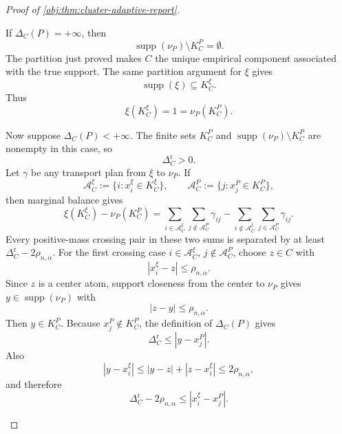 \begin{proof}[Proof of \cref{obj:thm:cluster-adaptive-report}]
\begin{enumerate}
If \(\Delta_C(P)=+\infty\), then
\[
\operatorname{supp}(\nu_P)\setminus K_C^P=\emptyset .
\]
The partition just proved makes \(C\) the unique empirical component associated
with the true support.  The same partition argument for \(\xi\) gives
\[
\operatorname{supp}(\xi)\subseteq K_C^\xi.
\]
Thus
\[
\xi(K_C^\xi)=1=\nu_P(K_C^P).
\]

Now suppose \(\Delta_C(P)<+\infty\).  The finite sets \(K_C^P\) and
\(\operatorname{supp}(\nu_P)\setminus K_C^P\) are nonempty in this case, so
\[
\Delta_C^{\mathrm r}>0.
\]
Let \(\gamma\) be any transport plan from \(\xi\) to \(\nu_P\).  If
\[
\mathscr A_C^\xi:=\{i:x_i^\xi\in K_C^\xi\},
\qquad
\mathscr A_C^P:=\{j:x_j^P\in K_C^P\},
\]
then marginal balance gives
\[
\xi(K_C^\xi)-\nu_P(K_C^P)
=
\sum_{i\in\mathscr A_C^\xi}\sum_{j\notin\mathscr A_C^P}\gamma_{ij}
-
\sum_{i\notin\mathscr A_C^\xi}\sum_{j\in\mathscr A_C^P}\gamma_{ij}.
\]
Every positive-mass crossing pair in these two sums is separated by at least
\(\Delta_C^{\mathrm r}-2\rho_{n,\alpha}\).  For the first crossing case
\(i\in\mathscr A_C^\xi\), \(j\notin\mathscr A_C^P\), choose
\(z\in C\) with
\[
|x_i^\xi-z|\le\rho_{n,\alpha}.
\]
Since \(z\) is a center atom, support closeness from the center to \(\nu_P\)
gives \(y\in\operatorname{supp}(\nu_P)\) with
\[
|z-y|\le\rho_{n,\alpha}.
\]
Then \(y\in K_C^P\).  Because \(x_j^P\notin K_C^P\), the definition of
\(\Delta_C(P)\) gives
\[
\Delta_C^{\mathrm r}\le |y-x_j^P|.
\]
Also
\[
|y-x_i^\xi|\le |y-z|+|z-x_i^\xi|\le2\rho_{n,\alpha},
\]
and therefore
\[
\Delta_C^{\mathrm r}-2\rho_{n,\alpha}
\le |x_i^\xi-x_j^P|.
\]


\end{enumerate}
\end{proof}

